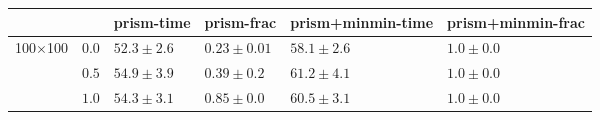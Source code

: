 \begin{tabular}{llllll}
\toprule
 &  & prism-time & prism-frac & prism+minmin-time & prism+minmin-frac \\
\midrule
\multirow[t]{3}{*}{100$\times$100} & $0.0$ & $52.3 \pm 2.6$ & $0.23 \pm 0.01$ & $58.1 \pm 2.6$ & $1.0 \pm 0.0$ \\
 & $0.5$ & $54.9 \pm 3.9$ & $0.39 \pm 0.2$ & $61.2 \pm 4.1$ & $1.0 \pm 0.0$ \\
 & $1.0$ & $54.3 \pm 3.1$ & $0.85 \pm 0.0$ & $60.5 \pm 3.1$ & $1.0 \pm 0.0$ \\
\cline{1-6}
\bottomrule
\end{tabular}
